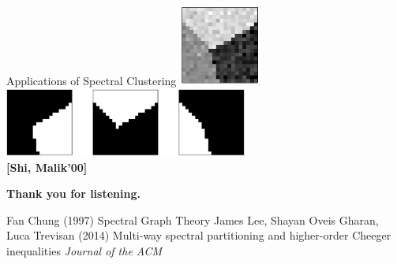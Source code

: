 \documentclass[aspectratio=169,xcolor=dvipsnames]{beamer}
\begin{document}
\begin{frame}{Applications of Spectral Clustering}
\centering
\includegraphics[width=0.20\textwidth]{shi-malik-1} \\
\centering
\vspace{1em}
\pause
\includegraphics[width=0.6\textwidth]{shi-malik-2} \\
\footnotesize \textbf{[Shi, Malik'00]}
\end{frame}

\begin{frame}
\Huge{\centerline{\textbf{Thank you for listening.}}}
    \footnotesize{
        \begin{thebibliography}{99}
            \centering
            \vspace{3em}
             Fan Chung (1997)
            \newblock Spectral Graph Theory
             James Lee, Shayan Oveis Gharan, Luca Trevisan (2014)
            \newblock  Multi-way spectral partitioning and higher-order Cheeger inequalities
            \newblock \emph{Journal of the ACM} 
        \end{thebibliography}
    }
\end{frame}
\end{document}
